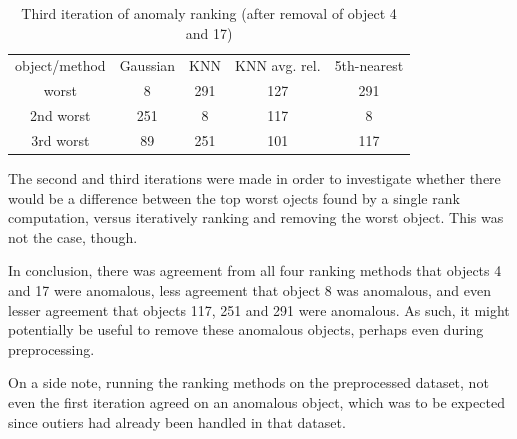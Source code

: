 \documentclass[a4paper,10pt]{article}
\begin{document}
\begin{table}[H]
\centering
\begin{tabular}{c | c c c c}
  object/method
        & Gaussian
                & KNN
                        & KNN avg. rel.
                          & 5th-nearest \\
  worst     & 8   & 291 & 127 & 291 \\
  2nd worst & 251 & 8   & 117 & 8   \\
  3rd worst & 89  & 251 & 101 & 117 
\end{tabular}
\caption{Third iteration of anomaly ranking (after removal of object 4 and 17)}
\label{table_ite3}
\end{table}

The second and third iterations were made in order to investigate whether there would be a difference between the top worst ojects found by a single rank computation, versus iteratively ranking and removing the worst object. This was not the case, though.

In conclusion, there was agreement from all four ranking methods that objects 4 and 17 were anomalous, less agreement that object 8 was anomalous, and even lesser agreement that objects 117, 251 and 291 were anomalous. As such, it might potentially be useful to remove these anomalous objects, perhaps even during preprocessing.

On a side note, running the ranking methods on the preprocessed dataset, not even the first iteration agreed on an anomalous object, which was to be expected since outiers had already been handled in that dataset.
\end{document}
